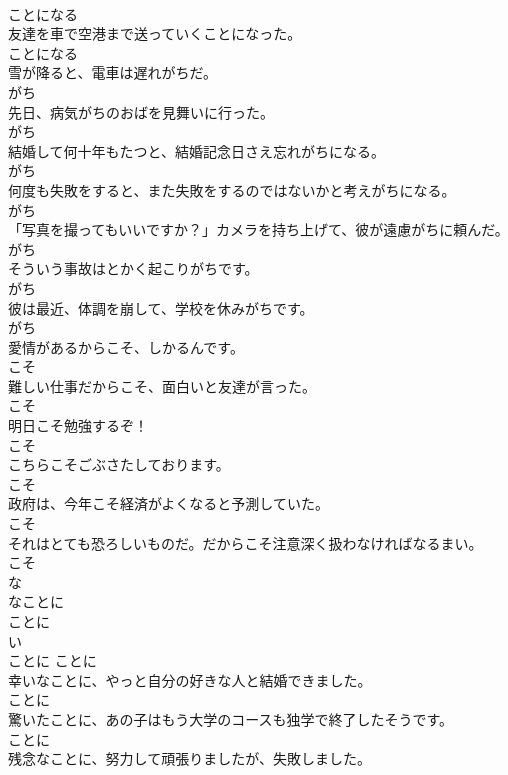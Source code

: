 \documentclass[8pt]{extreport}
\begin{document}
\begin{CJK}{UTF8}{min}
\\	ことになる
\\	友達を車で空港まで送っていくことになった。	
\\	ことになる
\\	雪が降ると、電車は遅れがちだ。	
\\	がち
\\	先日、病気がちのおばを見舞いに行った。	
\\	がち
\\	結婚して何十年もたつと、結婚記念日さえ忘れがちになる。	
\\	がち
\\	何度も失敗をすると、また失敗をするのではないかと考えがちになる。	
\\	がち
\\	「写真を撮ってもいいですか？」カメラを持ち上げて、彼が遠慮がちに頼んだ。	
\\	がち
\\	そういう事故はとかく起こりがちです。	
\\	がち
\\	彼は最近、体調を崩して、学校を休みがちです。	
\\	がち
\\	愛情があるからこそ、しかるんです。	
\\	こそ
\\	難しい仕事だからこそ、面白いと友達が言った。	
\\	こそ
\\	明日こそ勉強するぞ！	
\\	こそ
\\	こちらこそごぶさたしております。	
\\	こそ
\\	政府は、今年こそ経済がよくなると予測していた。	
\\	こそ
\\	それはとても恐ろしいものだ。だからこそ注意深く扱わなければなるまい。	
\\	こそ
\\	な
\\	なことに	
\\	ことに	
\\	い
\\	ことに	ことに
\\	幸いなことに、やっと自分の好きな人と結婚できました。	
\\	ことに
\\	驚いたことに、あの子はもう大学のコースも独学で終了したそうです。	
\\	ことに
\\	残念なことに、努力して頑張りましたが、失敗しました。	

\end{CJK}
\end{document}
